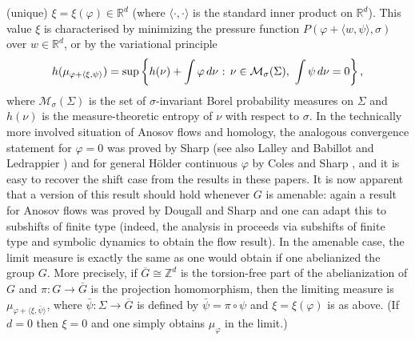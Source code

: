 \documentclass[11pt,letterpaper]{amsart}
\theoremstyle{definition}
\numberwithin{equation}{section}
\numberwithin{theorem}{section}
\def\Z{\mathbb{Z}}
\def\R{\mathbb{R}}
\def\vp{\varphi}
\def\R{\mathbb R}
\def\Z{\mathbb Z}
\begin{document}
(unique) $\xi = \xi(\vp) \in \R^d$ (where $\langle \cdot,\cdot \rangle$ is the standard inner product on $\R^d$).
This value $\xi$ is characterised by minimizing the pressure function $P(\vp+\langle w,\psi\rangle,\sigma)$
over $w \in \R^d$, or by the variational principle
\[
h(\mu_{\vp+\langle \xi,\psi \rangle}) = \sup\left\{h(\nu) + \int \vp \, d\nu \hbox{ : } \nu \in \mathcal M_\sigma(\Sigma),
\  \int \psi \, d\nu=0\right\},
\]
where $\mathcal M_\sigma(\Sigma)$ is the set of $\sigma$-invariant Borel probability measures on $\Sigma$
and $h(\nu)$ is the measure-theoretic entropy of $\nu$ with respect to $\sigma$.
In the technically more involved situation of Anosov flows and homology, the analogous
convergence statement for $\vp=0$ was proved by Sharp \cite{Sharp93} (see also Lalley \cite{LalleyAdv}
and Babillot and Ledrappier \cite{BabLed})
and for general H\"older continuous
$\vp$ by Coles and Sharp \cite{ColesSharp}, and it is easy to recover the shift case from the results in these
papers.
It is now apparent that a version of this result should hold whenever $G$ is amenable:
again a result for Anosov flows was proved by Dougall and Sharp \cite{DougallSharp2021}
and one can adapt this to subshifts of finite type (indeed, the analysis in \cite{DougallSharp2021}
proceeds via subshifts of finite type and symbolic dynamics to obtain the flow result).
In the amenable case, the limit measure is exactly the same as one would obtain if one abelianized the group $G$. More precisely, if $\overline{G}\cong \Z^d$ is the torsion-free part of the abelianization of $G$
and $\pi : G \to \overline{G}$ is the projection homomorphism, then
the limiting measure is $\mu_{\vp+\langle \xi,\bar \psi\rangle}$, where 
$\bar \psi : \Sigma \to \overline{G}$ is defined by $\bar \psi = \pi \circ \psi$ and
$\xi=\xi(\vp)$ is as above. (If $d=0$ then $\xi=0$ and one simply obtains $\mu_\vp$ in the limit.)
\end{document}

